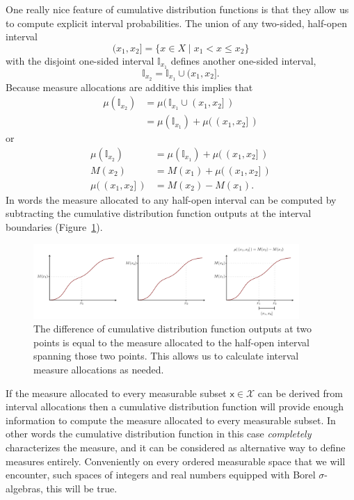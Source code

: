 \documentclass[
  letterpaper,
  DIV=11,
  numbers=noendperiod]{scrartcl}
\begin{document}
One really nice feature of cumulative distribution functions is that
they allow us to compute explicit interval probabilities. The union of
any two-sided, half-open interval \[
( x_{1}, x_{2} ] = \{ x \in X \mid x_{1} < x \le x_{2} \}
\] with the disjoint one-sided interval \(\mathbb{I}_{x_{1}}\) defines
another one-sided interval, \[
\mathbb{I}_{x_{2}} = \mathbb{I}_{x_{1}} \cup (x_{1}, x_{2}].
\] Because measure allocations are additive this implies that
\begin{align*}
\mu(\mathbb{I}_{x_{2}})
&= \mu( \, \mathbb{I}_{x_{1}} \cup (x_{1}, x_{2}] \, )
\\
&= \mu(\mathbb{I}_{x_{1}}) + \mu( \, (x_{1}, x_{2}] \, )
\end{align*} or \begin{align*}
\mu(\mathbb{I}_{x_{2}})
&=
\mu(\mathbb{I}_{x_{1}}) + \mu( \, (x_{1}, x_{2}] \, )
\\
M(x_{2})
&=
M(x_{1}) + \mu( \, (x_{1}, x_{2}] \, )
\\
\mu( \, (x_{1}, x_{2}] \, )
&
= M(x_{2})  - M(x_{1}).
\end{align*} In words the measure allocated to any half-open interval
can be computed by subtracting the cumulative distribution function
outputs at the interval boundaries (Figure~\ref{fig-cdf-probs}).

\begin{figure}

{\centering \includegraphics[width=0.9\textwidth,height=\textheight]{figures/cdfs/cdf_probs/cdf_probs.pdf}

}

\caption{\label{fig-cdf-probs}The difference of cumulative distribution
function outputs at two points is equal to the measure allocated to the
half-open interval spanning those two points. This allows us to
calculate interval measure allocations as needed.}

\end{figure}

If the measure allocated to every measurable subset
\(\mathsf{x} \in \mathcal{X}\) can be derived from interval allocations
then a cumulative distribution function will provide enough information
to compute the measure allocated to every measurable subset. In other
words the cumulative distribution function in this case
\emph{completely} characterizes the measure, and it can be considered as
alternative way to define measures entirely. Conveniently on every
ordered measurable space that we will encounter, such spaces of integers
and real numbers equipped with Borel \(\sigma\)-algebras, this will be
true.
\end{document}
